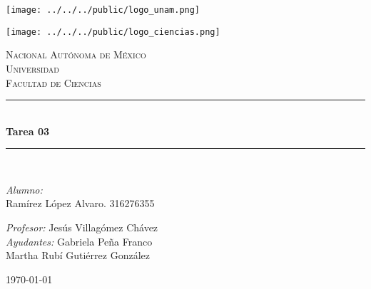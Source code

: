 \begin{center}
    \newcommand{\HRule}{\rule{\linewidth}{0.5mm}}
    \begin{minipage}{0.48\textwidth} 
        \begin{flushleft}
            \texttt{[image: ../../../public/logo\_unam.png]}
        \end{flushleft}
    \end{minipage}
    \begin{minipage}{0.48\textwidth} 
        \begin{flushright}
            \texttt{[image: ../../../public/logo\_ciencias.png]}
        \end{flushright}
    \end{minipage}
    \vspace*{-1.5cm}						
    \textsc{\huge Nacional Autónoma de México \\ \vspace{-4px} Universidad }\\[2cm]	
    \textsc{\LARGE Facultad de Ciencias}\\[1.5cm]
    \vspace*{1cm}					
        \HRule \\[0.7cm]							
            { \huge \bfseries Tarea 03}\\[0.4cm]	
        \HRule \\[1.5cm]						    
    \begin{minipage}{0.52\textwidth}													
        \begin{flushleft} \large	
            \small
            \vspace{-0.6cm}	
            \vspace{-0.6cm}	
                \emph{Alumno:}\\
               Ramírez López Alvaro. 316276355\\
            \vspace*{2cm}
        \end{flushleft}																		
        \end{minipage}		
    \begin{minipage}{0.46\textwidth}		
        \vspace{-0.6cm}											
        \begin{flushright} \large						
            \small										
            \emph{Profesor:} Jesús Villagómez Chávez	\\
            \emph{Ayudantes:}
                Gabriela Peña Franco	 \\
                Martha Rubí Gutiérrez González	 \\
        \end{flushright}																
    \end{minipage}	
    \vspace*{1cm}
    \vspace{2cm}
    \begin{center}						
        {\large \today}
    \end{center}  						
\end{center}	
\textbf{}
\newpage
